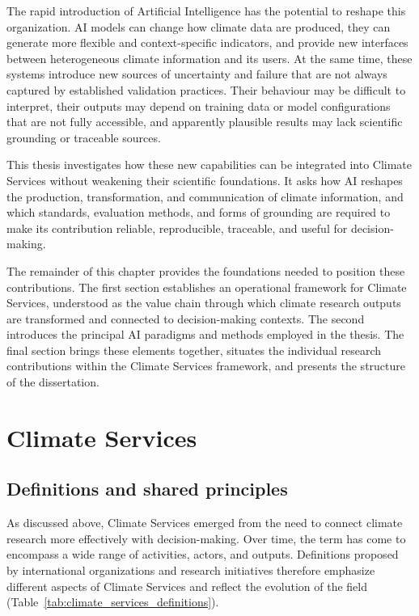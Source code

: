 The rapid introduction of Artificial Intelligence has the potential to reshape this organization. AI models can change how climate data are produced, they can generate more flexible and context-specific indicators, and provide new interfaces between heterogeneous climate information and its users. At the same time, these systems introduce new sources of uncertainty and failure that are not always captured by established validation practices. Their behaviour may be difficult to interpret, their outputs may depend on training data or model configurations that are not fully accessible, and apparently plausible results may lack scientific grounding or traceable sources.

This thesis investigates how these new capabilities can be integrated into Climate Services without weakening their scientific foundations. It asks how AI reshapes the production, transformation, and communication of climate information, and which standards, evaluation methods, and forms of grounding are required to make its contribution reliable, reproducible, traceable, and useful for decision-making.

The remainder of this chapter provides the foundations needed to position these contributions. The first section establishes an operational framework for Climate Services, understood as the value chain through which climate research outputs are transformed and connected to decision-making contexts. The second introduces the principal AI paradigms and methods employed in the thesis. The final section brings these elements together, situates the individual research contributions within the Climate Services framework, and presents the structure of the dissertation.

\section{Climate Services}
\subsection{Definitions and shared principles}

As discussed above, Climate Services emerged from the need to connect climate research more effectively with decision-making. Over time, the term has come to encompass a wide range of activities, actors, and outputs. Definitions proposed by international organizations and research initiatives therefore emphasize different aspects of Climate Services and reflect the evolution of the field (Table~\ref{tab:climate_services_definitions}).

